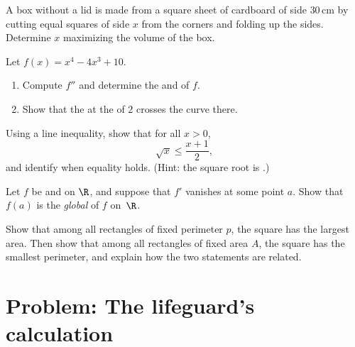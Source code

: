 \begin{exercise}[$\star\star$]\label{exo:g12:deriv:5}
A box without a lid is made from a square sheet of cardboard of side
$30\,$cm by cutting equal squares of side $x$ from the corners and folding up
the sides. Determine $x$ maximizing the volume of the box.
\end{exercise}

\begin{exercise}[$\star\star$]\label{exo:g12:deriv:6}
Let $f(x) = x^4 - 4x^3 + 10$.
\begin{enumerate}
  \item Compute $f''$ and determine the   and  of $f$.
  \item Show that the  at the  of  $2$
        crosses the curve there.
\end{enumerate}
\end{exercise}

\begin{exercise}[$\star\star$]\label{exo:g12:deriv:7}
Using a  line inequality, show that for all $x > 0$,
\[
\sqrt{x} \leq \frac{x + 1}{2},
\]
and identify when equality holds. (Hint: the square root is .)
\end{exercise}

\begin{exercise}[$\star\star\star$]\label{exo:g12:deriv:8}
Let $f$ be  and  on $\R$, and suppose that $f'$ vanishes
at some point $a$. Show that $f(a)$ is the \emph{global}  of $f$
on~$\R$.
\end{exercise}

\begin{exercise}[$\star\star\star$]\label{exo:g12:deriv:9}
Show that among all rectangles of fixed perimeter $p$, the square has the
largest area. Then show that among all rectangles of fixed area $A$, the
square has the smallest perimeter, and explain how the two statements are
related.
\end{exercise}

\section{Problem: The lifeguard's calculation}

